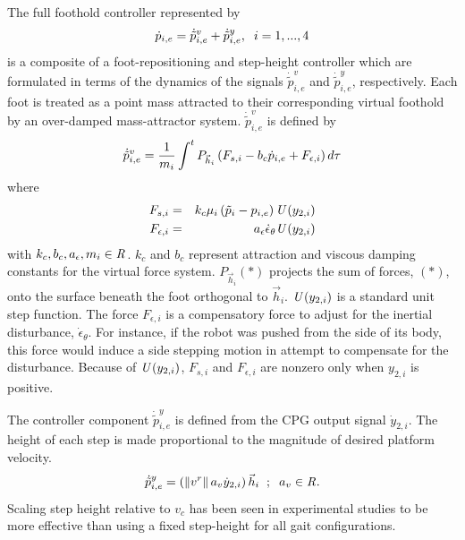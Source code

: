 %
		The full foothold controller represented by 
			\begin{equation}
				\dot{p}_{i,e} = \dot{\tilde{p}}_{i,e}^{v} + \dot{\tilde{p}}_{i,e}^{y}, \hspace{2mm} i = 1,...,4
			\end{equation} 
		is a composite of a foot-repositioning and step-height controller which are formulated in terms of the dynamics of the signals $\dot{\tilde{p}}_{i,e}^{v}$ and $\dot{\tilde{p}}_{i,e}^{y}$, respectively. Each foot is treated as a point mass attracted to their corresponding virtual foothold by an over-damped mass-attractor system. $\dot{\tilde{p}}_{i,e}^{v}$ is defined by
			\begin{equation}
				\label{eq::FootControl}
				\dot{\tilde{p}}_{i,e}^{v} 		= \frac{1}{m_{i}} \int^t{{P}_{\vec{h}_{i}} \left( F_{s,i}  -b_{c} \dot{p}_{i,e} + F_{\epsilon,i} \right) d\tau}
			\end{equation}
		where
			\begin{eqnarray*}
				F_{s,i} 			& = & k_{c}  \mu_{i} \left( \tilde{p}_{i} - {p}_{i,e} \right) \emph{U}\left(y_{2,i}\right)		\nonumber\\
				F_{\epsilon,i}		& = & a_{\epsilon}\dot{\epsilon}_{\theta} \emph{U}\left(y_{2,i}\right)						\nonumber
			\end{eqnarray*}
	 	with $k_{c},b_{c},a_{\epsilon},m_{i} \in\emph{R}^{}$.
		$k_{c}$ and $b_{c}$ represent  attraction and viscous damping constants for the virtual force system. ${P}_{\vec{h}_{i}}(*)$ projects the sum of  forces, $(*)$, onto the surface beneath the \Ith foot orthogonal to $\vec{h}_{i}$. $\emph{U}\left(y_{2,i}\right)$ is a standard unit step function. The force $F_{\epsilon,i}$ is a compensatory force to adjust for the inertial disturbance,  $\dot{\epsilon}_{\theta}$. For instance, if the robot was pushed from the side of its body, this force would induce a side stepping motion in attempt to compensate for the disturbance. Because of $\emph{U}\left(y_{2,i}\right)$, $F_{s,i}$ and $F_{\epsilon,i}$ are nonzero only when $y_{2,i}$ is positive.

		The controller component $\dot{\tilde{p}}_{i,e}^{y}$ is defined from the CPG output signal $\dot{y}_{2,i}$. The height of each step is made proportional to the magnitude of desired platform velocity.
		\begin{equation}
			\dot{\tilde{p}}_{i,e}^{y} 	= \left( \left\lVert v^{r}\right\rVert a_{v} \dot{y}_{2,i}\right) \vec{h}_{i} 	\hspace{2mm} ; \hspace{2mm} a_{v}  \in\emph{R}^{}.
			\label{eq::FootControl}
		\end{equation}
		Scaling step height relative to $v_c$ has been seen in experimental studies to be more effective than using a fixed step-height for all gait configurations. %




